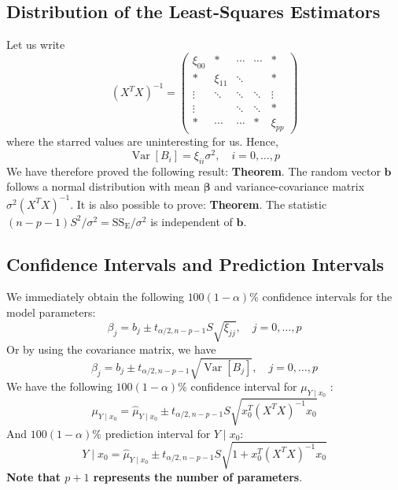\documentclass[a4paper,12pt]{article}
\begin{document}
\subsection{Distribution of the Least-Squares Estimators}
Let us write
$$
\left(X^T X\right)^{-1}=\left(\begin{array}{ccccc}
\xi_{00} & * & \cdots & \cdots & * \\
* & \xi_{11} & \ddots & & * \\
\vdots & \ddots & \ddots & \ddots & \vdots \\
\vdots & & \ddots & \ddots & * \\
* & \cdots & \cdots & * & \xi_{p p}
\end{array}\right)
$$
where the starred values are uninteresting for us.
Hence,
$$
\operatorname{Var}\left[B_i\right]=\xi_{i i} \sigma^2, \quad i=0, \ldots, p
$$
We have therefore proved the following result:
\textbf{Theorem}. The random vector $\boldsymbol{b}$ follows a normal distribution with mean $\boldsymbol{\beta}$ and variance-covariance matrix $\sigma^2\left(X^T X\right)^{-1}$.
It is also possible to prove:
\textbf{Theorem}. The statistic $(n-p-1) S^2 / \sigma^2=\mathrm{SS}_{\mathrm{E}} / \sigma^2$ is independent of $\boldsymbol{b}$.


\subsection{Confidence Intervals and Prediction Intervals}
We immediately obtain the following $100(1-\alpha) \%$ confidence intervals for the model parameters:
\begin{equation}
\beta_j=b_j \pm t_{\alpha / 2, n-p-1} S \sqrt{\xi_{j j}}, \quad j=0, \ldots, p
\end{equation}
Or by using the covariance matrix, we have
\begin{equation}
    \beta_j=b_j \pm t_{\alpha / 2, n-p-1} \sqrt{\operatorname{Var}[B_j]}, \quad j=0, \ldots, p
    \end{equation}
We have the following $100(1-\alpha) \%$ confidence interval for $\mu_{Y \mid x_0}$ :
\begin{equation}
\mu_{Y \mid x_0}=\widehat{\mu}_{Y \mid x_0} \pm t_{\alpha / 2, n-p-1} S \sqrt{x_0^T\left(X^T X\right)^{-1} x_0}
\end{equation}
And $100(1-\alpha) \%$ prediction interval for $Y \mid x_0$:
\begin{equation}
    Y \mid x_0=\widehat{\mu}_{Y \mid x_0} \pm t_{\alpha / 2, n-p-1} S \sqrt{1+x_0^T\left(X^T X\right)^{-1} x_0}
    \end{equation}
\textbf{Note that $p+1$ represents the number of parameters}.
\end{document}
